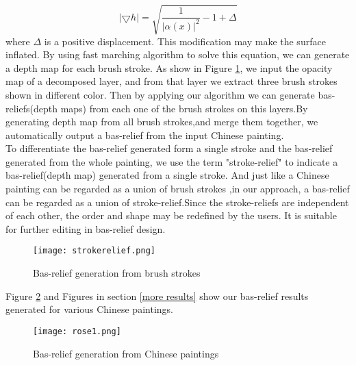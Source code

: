 \begin{equation}
\left| \bigtriangledown h \right| = \sqrt{\frac{1}{\left| \alpha(x) \right| ^2}-1+ \Delta}
\end{equation}
where $\Delta$ is a positive displacement. This modification may make the surface inflated. By using fast marching algorithm \cite{sethian1999level} to solve this equation, we can generate a depth map for each brush stroke. As show in Figure \ref{strokerelief}, we input the opacity map of a decomposed layer, and from that layer we extract three brush strokes shown in different color. Then by applying our algorithm we can generate bas-reliefs(depth maps) from each one of the brush strokes on this layers.By generating depth map from all brush strokes,and merge them together, we automatically output a bas-relief from the input Chinese painting. \\
To differentiate the bas-relief generated form a single stroke and the bas-relief generated from the whole painting, we use the term "stroke-relief" to indicate a bas-relief(depth map) generated from a single stroke. And just like a Chinese painting can be regarded as a union of brush strokes \cite{xu2006animating} ,in our approach, a bas-relief can be regarded as a union of stroke-relief.Since the stroke-reliefs are independent of each other, the order and shape may be redefined by the users. It is suitable for further editing in bas-relief design.
\begin{figure}
	\centering
	\texttt{[image: strokerelief.png]}
	\caption{Bas-relief generation from brush strokes}
	\label{strokerelief}
\end{figure}

Figure \ref{ch_pre} and Figures in section \ref{more results} show our bas-relief results generated for various Chinese paintings. 

\begin{figure}
	\centering
	\texttt{[image: rose1.png]}
	\caption{Bas-relief generation from Chinese paintings}
	\label{ch_pre}
\end{figure}

